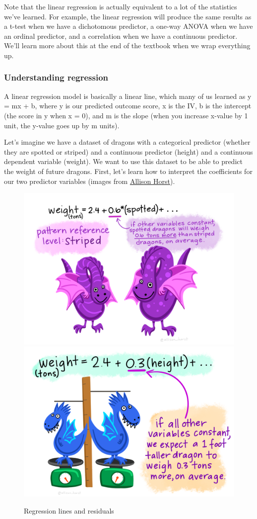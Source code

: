\documentclass[
]{book}
\begin{document}
Note that the linear regression is actually equivalent to a lot of the statistics we've learned. For example, the linear regression will produce the same results as a t-test when we have a dichotomous predictor, a one-way ANOVA when we have an ordinal predictor, and a correlation when we have a continuous predictor. We'll learn more about this at the end of the textbook when we wrap everything up.

\hypertarget{understanding-regression}{%
\subsubsection{Understanding regression}\label{understanding-regression}}

A linear regression model is basically a linear line, which many of us learned as y = mx + b, where y is our predicted outcome score, x is the IV, b is the intercept (the score in y when x = 0), and m is the slope (when you increase x-value by 1 unit, the y-value goes up by m units).

Let's imagine we have a dataset of dragons with a categorical predictor (whether they are spotted or striped) and a continuous predictor (height) and a continuous dependent variable (weight). We want to use this dataset to be able to predict the weight of future dragons. First, let's learn how to interpret the coefficients for our two predictor variables (images from \href{https://github.com/allisonhorst/stats-illustrations\#multiple-linear-regression-dragons-thread}{Allison Horst}).

\begin{figure}

{\centering \includegraphics[width=0.49\linewidth]{images/13-regression/dragon_categorical} \includegraphics[width=0.49\linewidth]{images/13-regression/dragons_continuous} 

}

\caption{Regression lines and residuals}\label{fig:unnamed-chunk-1}
\end{figure}
\end{document}
